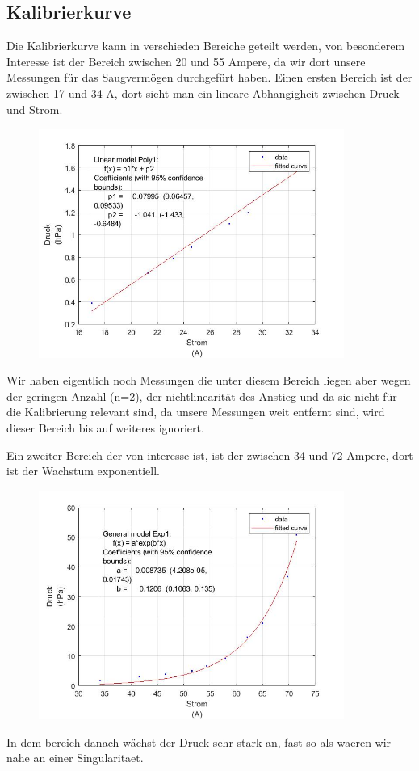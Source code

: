 \documentclass[12pt]{article}
\begin{document}
	\subsection{Kalibrierkurve}
	Die Kalibrierkurve kann in verschieden Bereiche geteilt werden, von besonderem Interesse ist der Bereich zwischen 20 und 55 Ampere, da wir dort unsere Messungen für das Saugvermögen durchgefürt haben. Einen ersten Bereich ist der zwischen 17 und 34 A, dort sieht man ein lineare Abhangigheit zwischen Druck und Strom. 
		\begin{figure}[H]
		\centering
		\includegraphics[width=10cm]{Kalibrierung (17-32).jpg}
		\label{fig: Kalibrierung(17-32)}
		\end{figure}
	Wir haben eigentlich noch Messungen die unter diesem Bereich liegen aber wegen der geringen Anzahl (n=2), der nichtlinearität des Anstieg und da sie nicht für die Kalibrierung relevant sind, da unsere Messungen weit entfernt sind, wird dieser Bereich bis auf weiteres ignoriert. 
	
	Ein zweiter Bereich der von interesse ist, ist der zwischen 34 und 72 Ampere, dort ist der Wachstum exponentiell.
			\begin{figure}[H]
				\centering
				\includegraphics[width=10cm]{Kalibrierung (32-71).jpg}
				\label{fig: Kalibrierung(32-71)}
			\end{figure}
	In dem bereich danach wächst der Druck sehr stark an, fast so als waeren wir nahe an einer Singularitaet.
	
\end{document}
